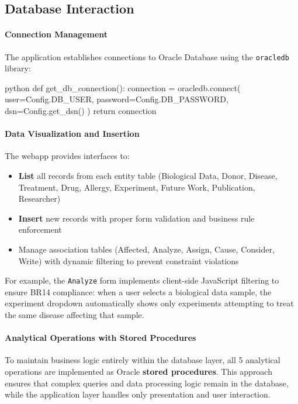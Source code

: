 \documentclass[11pt,a4paper]{article}
\begin{document}
\subsection{Database Interaction}

\paragraph{Connection Management}
The application establishes connections to Oracle Database using the \texttt{oracledb} library:
\begin{sqlbox}{python}
def get_db_connection():
    connection = oracledb.connect(
        user=Config.DB_USER,
        password=Config.DB_PASSWORD,
        dsn=Config.get_dsn()
    )
    return connection
\end{sqlbox}

\paragraph{Data Visualization and Insertion}
The webapp provides interfaces to:
\begin{itemize}
    \item \textbf{List} all records from each entity table (Biological Data, Donor, Disease, Treatment, Drug, Allergy, Experiment, Future Work, Publication, Researcher)
    \item \textbf{Insert} new records with proper form validation and business rule enforcement
    \item Manage association tables (Affected, Analyze, Assign, Cause, Consider, Write) with dynamic filtering to prevent constraint violations
\end{itemize}

For example, the \texttt{Analyze} form implements client-side JavaScript filtering to ensure BR14 compliance: when a user selects a biological data sample, the experiment dropdown automatically shows only experiments attempting to treat the same disease affecting that sample.

\paragraph{Analytical Operations with Stored Procedures}
To maintain business logic entirely within the database layer, all 5 analytical operations are implemented as Oracle \textbf{stored procedures}. This approach ensures that complex queries and data processing logic remain in the database, while the application layer handles only presentation and user interaction.
\end{document}
